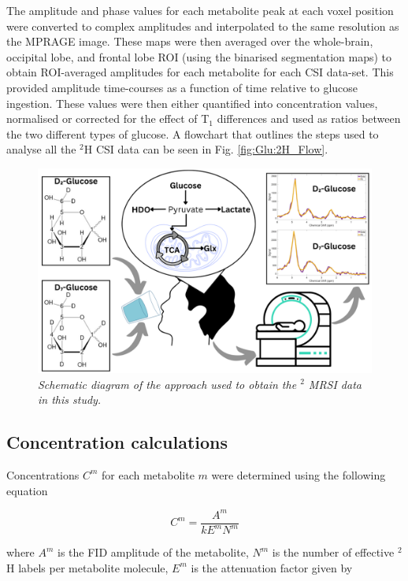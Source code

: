 The amplitude and phase values for each metabolite peak at each voxel position were converted to complex amplitudes and interpolated to the same resolution as the \ac{MPRAGE} image. These maps were then averaged over the whole-brain, occipital lobe, 
 and frontal lobe \ac{ROI} (using the binarised segmentation maps) to obtain \ac{ROI}-averaged amplitudes for each metabolite for each \ac{CSI} data-set. This provided amplitude time-courses as a function of time relative to glucose ingestion. These values were then either quantified into concentration values, normalised or corrected for the effect of T$_1$ differences and used as ratios between the two different types of glucose. A flowchart that outlines the steps used to analyse all the $^2$H \ac{CSI} data can be seen in Fig. \ref{fig:Glu:2H_Flow}.

\begin{figure}
    \centering
    \includegraphics[width = 1\textwidth]{Figures/Glucose/Study_Day.png}
    \caption{\textit{Schematic diagram of the approach used to obtain the $^2$ MRSI data in this study.}}
    \label{fig:Glu:Study_Day}
\end{figure}

\subsection{Concentration calculations}

Concentrations $C^m$ for each metabolite $m$ were determined using the following equation

\begin{equation}
    C^m = \frac{A^m}{kE^mN^m}
    \label{eqn:Glu:Conc}
\end{equation}

where $A^m$ is the FID amplitude of the metabolite, $N^m$ is the number of effective $^2$H labels per metabolite molecule, $E^m$ is the attenuation factor given by

